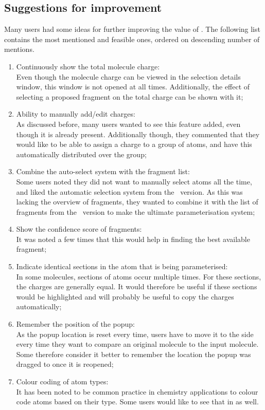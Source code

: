 \subsection{Suggestions for improvement}
Many users had some ideas for further improving the value of \oframp. The following list contains the most mentioned and feasible ones, ordered on descending number of mentions.
\begin{enumerate}
\item Continuously show the total molecule charge:\\
Even though the molecule charge can be viewed in the selection details window, this window is not opened at all times. Additionally, the effect of selecting a proposed fragment on the total charge can be shown with it;
\item Ability to manually add/edit charges:\\
As discussed before, many users wanted to see this feature added, even though it is already present. Additionally though, they commented that they would like to be able to assign a charge to a group of atoms, and have this automatically distributed over the group;
\item Combine the auto-select system with the fragment list:\\
Some users noted they did not want to manually select atoms all the time, and liked the automatic selection system from the \IDb\ version. As this was lacking the overview of fragments, they wanted to combine it with the list of fragments from the \IDa\ version to make the ultimate parameterisation system;
\item Show the confidence score of fragments:\\
It was noted a few times that this would help in finding the best available fragment;
\item Indicate identical sections in the atom that is being parameterised:\\
In some molecules, sections of atoms occur multiple times. For these sections, the charges are generally equal. It would therefore be useful if these sections would be highlighted and will probably be useful to copy the charges automatically;
\item Remember the position of the popup:\\
As the popup location is reset every time, users have to move it to the side every time they want to compare an original molecule to the input molecule. Some therefore consider it better to remember the location the popup was dragged to once it is reopened;
\item Colour coding of atom types:\\
It has been noted to be common practice in chemistry applications to colour code atoms based on their type. Some users would like to see that in \oframp{} as well.
\end{enumerate}
